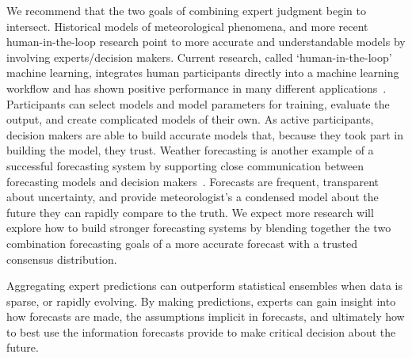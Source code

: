 \documentclass[preprint,authoryear,nonatbib]{elsarticle}
\begin{document}
We recommend that the two goals of combining expert judgment begin to intersect.
Historical models of meteorological phenomena, and more recent human-in-the-loop research point to more accurate and understandable models by involving experts/decision makers.
Current research, called `human-in-the-loop' machine learning, integrates human participants directly into a machine learning workflow and has shown positive performance in many different applications~\parencite{cranor2008framework,holzinger2016interactive,yu2015lsun,li2017human}.
Participants can select models and model parameters for training, evaluate the output, and create complicated models of their own.
As active participants, decision makers are able to build accurate models that, because they took part in building the model, they trust.
%
Weather forecasting is another example of a successful forecasting system by supporting close communication between forecasting models and decision makers~\parencite{murphy1984probability,murphy1974probability,murphy1974subjective}.
Forecasts are frequent, transparent about uncertainty, and provide meteorologist's a condensed model about the future they can rapidly compare to the truth.
We expect more research will explore how to build stronger forecasting systems by blending together the two combination forecasting goals of a more accurate forecast with a trusted consensus distribution.


Aggregating expert predictions can outperform statistical ensembles when data is sparse, or rapidly evolving.
By making predictions, experts can gain insight into how forecasts are made, the assumptions implicit in forecasts, and ultimately how to best use the information forecasts provide to make critical decision about the future.
\end{document}
